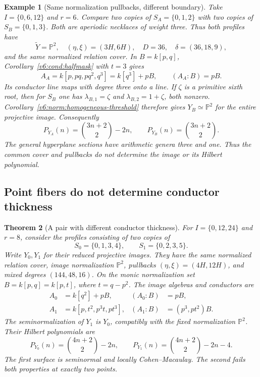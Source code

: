 \documentclass[10pt,fleqn]{article}
\numberwithin{equation}{section}
\newtheorem{theorem}{Theorem}[section]
\newtheorem{example}[theorem]{Example}
\newcommand{\PP}{\mathbb P}
\begin{document}
\begin{example}[Same normalization pullbacks, different boundary]
\label{v6:cond:degree-nine}
Take $I=\{0,6,12\}$ and $r=6$.  Compare two copies of
$S_A=\{0,1,2\}$ with two copies of $S_B=\{0,1,3\}$.  Both are
aperiodic necklaces of weight three.  Thus both profiles have
\[
 \widetilde Y=\PP^2,\quad(\eta,\xi)=(3H,6H),\quad
 D=36,\quad\delta=(36,18,9),
\]
and the same normalized relation cover.  In $B=k[p,q]$,
Corollary~\ref{v6:cond:halfmask} with $t=3$ gives
\[
 A_A=k[p,pq,pq^2,q^3]=k[q^3]+pB,\qquad(A_A:B)=pB.
\]
Its conductor line maps with degree three onto a line.  If $\zeta$ is
a primitive sixth root, then for $S_B$ one has
$\lambda_{B,1}=\zeta$ and $\lambda_{B,2}=1+\zeta$, both nonzero.
Corollary~\ref{v6:norm:homogeneous-threshold} therefore gives $Y_B\simeq\PP^2$
for the entire projective image.  Consequently
\[
 P_{Y_A}(n)=\binom{3n+2}{2}-2n,
 \qquad P_{Y_B}(n)=\binom{3n+2}{2}.
\]
The general hyperplane sections have arithmetic genera three and one.
Thus the common cover and pullbacks do not determine the image or its
Hilbert polynomial.
\end{example}

\subsection{Point fibers do not determine conductor thickness}
\label{r24:separation:thickness}

\begin{theorem}[A pair with different conductor thickness]
\label{v6:cond:thick}
For $I=\{0,12,24\}$ and $r=8$, consider the profiles consisting of two
copies of
\[
 S_0=\{0,1,3,4\},\qquad S_1=\{0,2,3,5\}.
\]
Write $Y_0,Y_1$ for their reduced projective images.  They have the
same normalized relation cover, image normalization $\PP^2$,
pullbacks $(\eta,\xi)=(4H,12H)$, and mixed degrees $(144,48,16)$.
On the monic normalization set $B=k[p,q]=k[p,t]$, where $t=q-p^2$.
The image algebras and conductors are
\begin{align}
 A_0&=k[q^2]+pB,&(A_0:B)&=pB,\label{v6:cond:thin-ring}\\
 A_1&=k[p,t^2,p^3t,pt^3],&(A_1:B)&=(p^3,pt^2)B.
 \label{v6:cond:thick-ring}
\end{align}
The seminormalization of $Y_1$ is $Y_0$, compatibly with the fixed
normalization $\PP^2$.  Their Hilbert polynomials are
\begin{equation}\label{v6:cond:thick-hilbert}
 P_{Y_0}(n)=\binom{4n+2}{2}-2n,
 \qquad P_{Y_1}(n)=\binom{4n+2}{2}-2n-4.
\end{equation}
The first surface is seminormal and locally Cohen--Macaulay.  The
second fails both properties at exactly two points.
\end{theorem}
\end{document}
